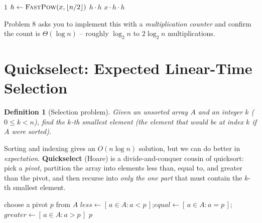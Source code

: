 \documentclass[11pt]{article}
\newtheorem{definition}[theorem]{Definition}
\begin{document}
\begin{algorithm}[h]
\caption{Fast exponentiation (exponentiation by squaring)}
\begin{algorithmic}[1]
     \State \Return $1$ \EndIf
    \State $h \gets \Call{FastPow}{x, \lfloor n/2 \rfloor}$
     \State \Return $h \cdot h$
    \Else \State \Return $x \cdot h \cdot h$
    \EndIf
\EndFunction
\end{algorithmic}
\end{algorithm}

Problem 8 asks you to implement this with a \emph{multiplication counter} and confirm the
count is $\Theta(\log n)$ -- roughly $\log_2 n$ to $2\log_2 n$ multiplications.

\section{Quickselect: Expected Linear-Time Selection}

\begin{definition}[Selection problem]
Given an unsorted array $A$ and an integer $k$ ($0 \le k < n$), find the $k$-th smallest
element (the element that would be at index $k$ if $A$ were sorted).
\end{definition}

Sorting and indexing gives an $O(n \log n)$ solution, but we can do better in
\emph{expectation}. \textbf{Quickselect} (Hoare) is a divide-and-conquer cousin of
quicksort: pick a \emph{pivot}, partition the array into elements less than, equal to, and
greater than the pivot, and then recurse into \emph{only the one part} that must contain the
$k$-th smallest element.

\begin{algorithm}[h]
\caption{Quickselect}
\begin{algorithmic}[1]
    \State choose a pivot $p$ from $A$
    \State $\mathit{less} \gets [\,a \in A : a < p\,]$;\quad $\mathit{equal} \gets [\,a \in A : a = p\,]$;\quad $\mathit{greater} \gets [\,a \in A : a > p\,]$
     \State \Return {}
     \State \Return $p$
    \Else \State \Return {}
    \EndIf
\EndFunction
\end{algorithmic}
\end{algorithm}
\end{document}
